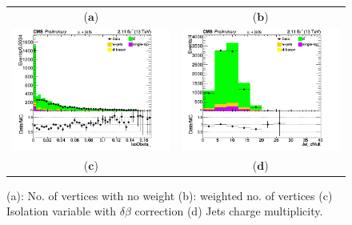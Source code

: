 \documentclass{cmspaper}
\begin{document}
\begin{figure}[htp]
\begin{tabular}{cc}
   ($\mathbf{a}$)\qquad\qquad&($\mathbf{b}$)\qquad\qquad\qquad\\
\hspace{-0.5cm}
\includegraphics[scale=0.40]{results/IsoDbeta_.png}
& \hspace{-0.5cm} \includegraphics[scale=0.40]{results/Jet_cMult.png}\\
   ($\mathbf{c}$)\qquad\qquad&($\mathbf{d}$)\qquad\qquad\qquad\\
\end{tabular}
\caption{(a): No. of vertices with no weight (b): weighted no. of vertices (c) Isolation variable with $\delta\beta$ correction (d) Jets charge multiplicity.}\label{no_vertex}
\end{figure}
\end{document}
